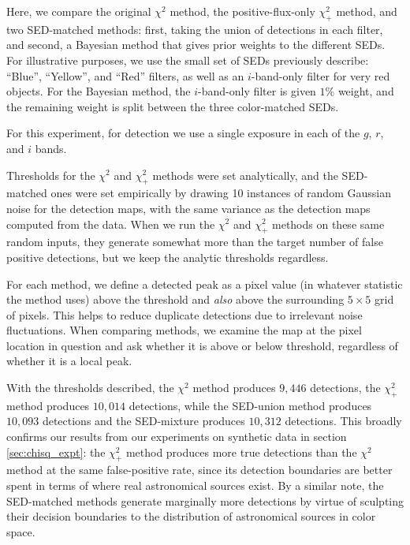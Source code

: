 \documentclass[11pt,letterpaper,linenumbers]{aastex63}
\newcommand{\chipos}{\chi_+}
\begin{document}
Here, we compare the original $\chi^2$ method, the positive-flux-only
$\chipos^2$ method, and two SED-matched methods: first, taking the
union of detections in each filter, and second, a Bayesian method that
gives prior weights to the different SEDs.  For illustrative purposes,
we use the small set of SEDs previously describe: ``Blue'',
``Yellow'', and ``Red'' filters, as well as an $i$-band-only filter
for very red objects.  For the Bayesian method, the $i$-band-only
filter is given $1\%$ weight, and the remaining weight is split
between the three color-matched SEDs.

For this experiment, for detection we use a single exposure in each of
the $g$, $r$, and $i$ bands.

Thresholds for the $\chi^2$ and $\chipos^2$ methods were set
analytically, and the SED-matched ones were set empirically by drawing
10 instances of random Gaussian noise for the detection maps, with the same
variance as the detection maps computed from the data.  When we run
the $\chi^2$ and $\chipos^2$ methods on these same random inputs, they
generate somewhat more than the target number of false positive
detections, but we keep the analytic thresholds regardless.


For each method, we define a detected peak as a pixel value (in
whatever statistic the method uses) above the threshold and
\emph{also} above the surrounding $5 \times 5$ grid of pixels.  This
helps to reduce duplicate detections due to irrelevant noise
fluctuations.  When comparing methods, we examine the map at the pixel
location in question and ask whether it is above or below threshold,
regardless of whether it is a local peak.

With the thresholds described, the $\chi^2$ method produces $9,446$
detections, the $\chipos^2$ method produces $10,014$ detections, while
the SED-union method produces $10,093$ detections and the SED-mixture
produces $10,312$ detections.  This broadly confirms our results from
our experiments on synthetic data in section \ref{sec:chisq_expt}: the
$\chipos^2$ method produces more true detections than the $\chi^2$
method at the same false-positive rate, since its detection boundaries
are better spent in terms of where real astronomical sources exist.
By a similar note, the SED-matched methods generate marginally more
detections by virtue of sculpting their decision boundaries to the
distribution of astronomical sources in color space.
\end{document}
